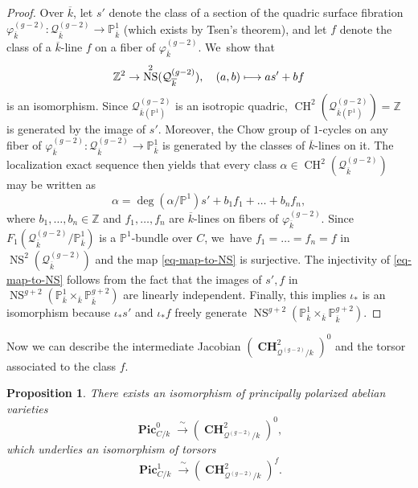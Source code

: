 \documentclass[JEP,XML,SOM,Unicode,NoEqCountersInSection,published]{cedram}
\newcommand\mto{\mathchoice{\longmapsto}{\mapsto}{\mapsto}{\mapsto}}
\theoremstyle{plain}
\newtheorem{prop}[thm]{Proposition}
\theoremstyle{definition}
\DeclareMathOperator{\CH}{CH}
\DeclareMathOperator{\bCH}{\mathbf{CH}}
\DeclareMathOperator{\NS}{NS}
\DeclareMathOperator{\bPic}{\mathbf{Pic}}
\newcommand{\kbar}{{\overline{k}}}
\let\phi\varphi
\renewcommand\P{\mathbb{P}}
\newcommand\Z{\mathbb{Z}}
\begin{document}
\begin{proof}
Over \(\kbar\), let \(s'\) denote the class of a section of the quadric surface fibration $\phi^{(g-2)}_\kbar \colon \mathcal{Q}^{(g-2)}_{\kbar}\to \P^1_{\kbar}$ (which exists by Tsen's theorem), and let \(f\) denote the class of a \(\kbar\)-line $f$ on a fiber of \(\phi^{(g-2)}_\kbar\). We~show that
\begin{align}\label{eq-map-to-NS}
\Z^2\to \NS^2(\mathcal{Q}^{(g-2)}_{\kbar}), \quad (a,b)\mto a s' + bf
\end{align}
is an isomorphism.
Since $\mathcal{Q}^{(g-2)}_{\kbar(\P^1)}$ is an isotropic quadric, $\CH^2(\mathcal{Q}^{(g-2)}_{\kbar(\P^1)})=\Z$ is generated by the image of $s'$.
Moreover, the Chow group of $1$-cycles on any fiber of $\phi^{(g-2)}_\kbar\colon\mathcal{Q}^{(g-2)}_{\kbar}\to \P^1_{\kbar}$ is generated by the classes of \(\kbar\)-lines on it.
The localization exact sequence then yields that every class $\alpha \in \CH^2(\mathcal{Q}^{(g-2)}_{\kbar})$ may be written as
\[
\alpha = \deg(\alpha/\P^1)s' + b_1f_1+\dots + b_nf_n,
\]
where $b_1,\dots, b_n\in \Z$ and $f_1, \dots, f_n$ are \(\kbar\)-lines on fibers of \(\phi^{(g-2)}_\kbar\).
Since $F_1(\mathcal{Q}^{(g-2)}_{\kbar}/\P^1_{\kbar})$ is a $\P^1$-bundle over $C$, we~have $f_1=\dots =f_n=f$ in $\NS^2(\mathcal{Q}^{(g-2)}_{\kbar})$ and the map \eqref{eq-map-to-NS} is surjective.
The injectivity of \eqref{eq-map-to-NS} follows from the fact that the images of $s',f$ in $\NS^{g+2}(\P^1_{\kbar}\times_{\kbar}\P^{g+2}_{\kbar})$ are linearly independent.
Finally, this implies \(\iota_*\) is an isomorphism because \(\iota_* s'\) and \(\iota_* f\) freely generate \(\NS^{g+2}(\P^1_{\kbar}\times_{\kbar}\P^{g+2}_{\kbar})\).
\end{proof}

Now we can describe the intermediate Jacobian \((\bCH^2_{\mathcal{Q}^{(g-2)}/k})^0\) and the torsor associated to the class \(f\).

\begin{prop}\label{prop-pic1ch2f}
There exists an isomorphism of principally polarized abelian varieties
\[
\bPic_{C/k}^0\xrightarrow{\;\sim\;}(\bCH^2_{\mathcal{Q}^{(g-2)}/k})^0,
\]
which underlies an isomorphism of torsors
\[
\bPic_{C/k}^1\xrightarrow{\;\sim\;}(\bCH^2_{\mathcal{Q}^{(g-2)}/k})^f.
\]

\end{prop}
\end{document}
